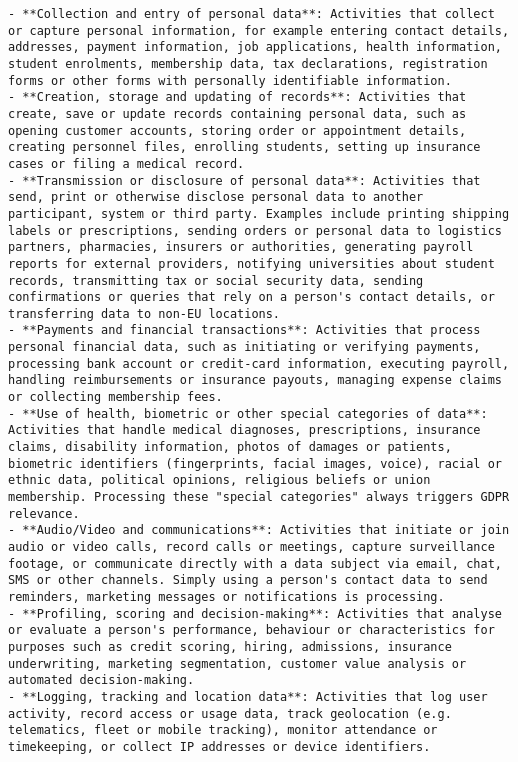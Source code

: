 \begin{lstlisting}[caption={System-Prompt fuer die DSGVO-Klassifikation von BPMN-Aktivitäten},label={lst:system-prompt}]
- **Collection and entry of personal data**: Activities that collect or capture personal information, for example entering contact details, addresses, payment information, job applications, health information, student enrolments, membership data, tax declarations, registration forms or other forms with personally identifiable information.
- **Creation, storage and updating of records**: Activities that create, save or update records containing personal data, such as opening customer accounts, storing order or appointment details, creating personnel files, enrolling students, setting up insurance cases or filing a medical record.
- **Transmission or disclosure of personal data**: Activities that send, print or otherwise disclose personal data to another participant, system or third party. Examples include printing shipping labels or prescriptions, sending orders or personal data to logistics partners, pharmacies, insurers or authorities, generating payroll reports for external providers, notifying universities about student records, transmitting tax or social security data, sending confirmations or queries that rely on a person's contact details, or transferring data to non-EU locations.
- **Payments and financial transactions**: Activities that process personal financial data, such as initiating or verifying payments, processing bank account or credit-card information, executing payroll, handling reimbursements or insurance payouts, managing expense claims or collecting membership fees.
- **Use of health, biometric or other special categories of data**: Activities that handle medical diagnoses, prescriptions, insurance claims, disability information, photos of damages or patients, biometric identifiers (fingerprints, facial images, voice), racial or ethnic data, political opinions, religious beliefs or union membership. Processing these "special categories" always triggers GDPR relevance.
- **Audio/Video and communications**: Activities that initiate or join audio or video calls, record calls or meetings, capture surveillance footage, or communicate directly with a data subject via email, chat, SMS or other channels. Simply using a person's contact data to send reminders, marketing messages or notifications is processing.
- **Profiling, scoring and decision-making**: Activities that analyse or evaluate a person's performance, behaviour or characteristics for purposes such as credit scoring, hiring, admissions, insurance underwriting, marketing segmentation, customer value analysis or automated decision-making.
- **Logging, tracking and location data**: Activities that log user activity, record access or usage data, track geolocation (e.g. telematics, fleet or mobile tracking), monitor attendance or timekeeping, or collect IP addresses or device identifiers.

\end{lstlisting}
